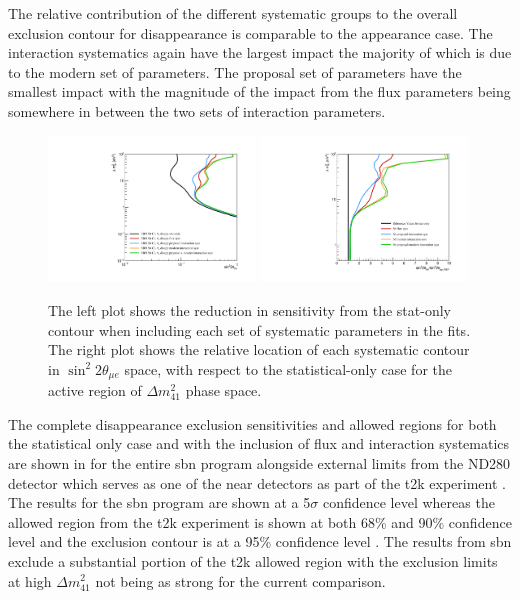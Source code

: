 The relative contribution of the different systematic groups to the overall exclusion contour for \nue disappearance is comparable to the \nue appearance case. The interaction systematics again have the largest impact the majority of which is due to the modern set of parameters. The proposal set of parameters have the smallest impact with the magnitude of the impact from the flux parameters being somewhere in between the two sets of interaction parameters.

\begin{figure}[h!]
    \centering
    \includegraphics[width = 0.49\textwidth]{figures-chap6/exclusion_contours/nue_disapp_syst_groups.pdf}
    \includegraphics[width = 0.49\textwidth]{figures-chap6/exclusion_contours/nue_disapp_syst_groups_ratios.pdf}
    \caption[\nue app sensitivity reduction from different systematic groups.]{The left plot shows the reduction in sensitivity from the stat-only contour when including each set of systematic parameters in the fits. The right plot shows the relative location of each systematic contour in $\sin^{2}2\theta_{\mu e}$ space, with respect to the statistical-only case for the active region of $\Delta m_{41}^{2}$ phase space.}
    \label{fig:nue_disapp_syst_groups}
\end{figure}

\newpage
The complete \nue disappearance exclusion sensitivities and allowed regions for both the statistical only case and with the inclusion of flux and interaction systematics are shown in  for the entire \gls{sbn} program alongside external limits from the ND280 detector which serves as one of the near detectors as part of the \gls{t2k} experiment \cite{t2k_experiment}. The results for the \gls{sbn} program are shown at a 5$\sigma$ confidence level whereas the allowed region from the \gls{t2k} experiment is shown at both 68\% and 90\% confidence level and the exclusion contour is at a 95\% confidence level \cite{T2K_nue_disapp_contour}. The results from \gls{sbn} exclude a substantial portion of the \gls{t2k} allowed region with the exclusion limits at high $\Delta m^2_{41}$ not being as strong for the current comparison. 

